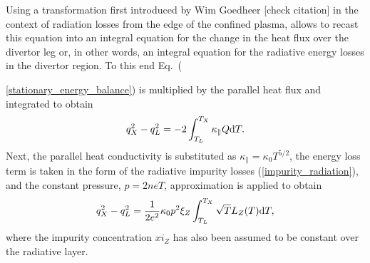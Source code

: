 \documentclass[amsmath,amssymb,a4]{revtex4-2}
\begin{document}
Using a transformation first introduced by Wim Goedheer [check citation] in the context of radiation losses from the edge of the confined plasma, allows to recast this equation into an integral equation for the change in the heat flux over the divertor leg or, in other words, an integral equation for the radiative energy losses in the divertor region. To this end Eq.~({\ref{stationary_energy_balance}) is multiplied by the parallel heat flux and integrated to obtain
\begin{equation}\label{flux_change}
    q_X^2 - q_L^2 = - 2 \int_{T_L}^{T_X} \kappa_\parallel Q {\rm d}T.
\end{equation}
Next, the parallel heat conductivity is substituted as $\kappa_\parallel = \kappa_0 T^{5/2}$, the energy loss term is taken in the form of the radiative impurity losses (\ref{impurity_radiation}), and the constant pressure, $ p = 2 neT$, approximation is applied to obtain~\cite{lengyel1981,capes1992,hutchinson1994}
\begin{equation}\label{flux_change_2}
    q_X^2 - q_L^2 = {1\over2 e^2} \kappa_0 p^2 \xi_Z \int_{T_L}^{T_X} \sqrt{T} L_Z(T) {\rm d}T,
\end{equation}
where the impurity concentration $xi_Z$ has also been assumed to be constant over the radiative layer.

}
\end{document}
